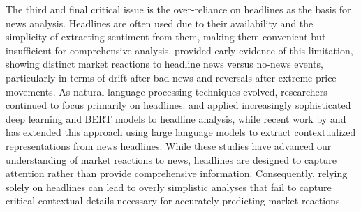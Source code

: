 \mx 
The third and final critical issue is the over-reliance on headlines as the basis for news analysis.
Headlines are often used due to their availability and the simplicity of extracting sentiment from them, making them convenient but insufficient for comprehensive analysis. 
\cite{chan2003stock} %
provided early evidence of this limitation, showing distinct market reactions to headline news versus no-news events, particularly in terms of drift after bad news and reversals after extreme price movements. As natural language processing techniques evolved, researchers continued to focus primarily on headlines: 
\cite{oncharoen2018deep} %
and 
\cite{wei2018stock} %
applied increasingly sophisticated deep learning and BERT models to headline analysis, while recent work by 
\cite{lopez2023can} %
and 
\cite{chen2022expected} %
has extended this approach using large language models to extract contextualized representations from news headlines.
While these studies have advanced our understanding of market reactions to news, headlines are designed to capture attention rather than provide comprehensive information. Consequently, relying solely on headlines can lead to overly simplistic analyses that fail to capture critical contextual details necessary for accurately predicting market reactions.


